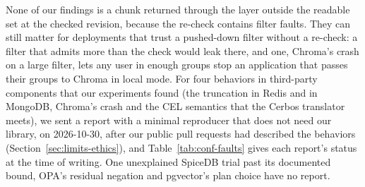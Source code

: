 None of our findings is a chunk returned through the layer outside the readable set at the checked
revision, because the re-check contains filter faults. They can still matter for deployments that
trust a pushed-down filter without a re-check: a filter that admits more than the check would leak
there, and one, Chroma's crash on a large filter, lets any user in enough groups stop an application
that passes their groups to Chroma in local mode. For four behaviors in third-party components that our experiments
found (the truncation in Redis and in MongoDB, Chroma's crash and the CEL semantics that the Cerbos
translator meets), we sent a report with a minimal reproducer that does not need our library, on 2026-10-30, after our public pull requests had described the behaviors (Section~\ref{sec:limits-ethics}), and
Table~\ref{tab:conf-faults} gives each report's status at the time of writing. One unexplained SpiceDB trial
past its documented bound, OPA's residual negation and pgvector's plan choice have no report.
